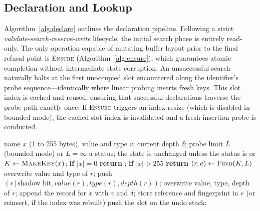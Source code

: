 \subsection{Declaration and Lookup}
Algorithm~\ref{alg:declare} outlines the declaration pipeline. Following a strict \emph{validate-search-reserve-write} lifecycle, the initial search phase is entirely read-only. The only operation capable of mutating buffer layout prior to the final refusal point is \textsc{Ensure} (Algorithm~\ref{alg:ensure}), which guarantees atomic completion without intermediate state corruption. An unsuccessful search naturally halts at the first unoccupied slot encountered along the identifier's probe sequence—identically where linear probing inserts fresh keys. This slot index is cached and reused, ensuring that successful declarations traverse the probe path exactly once. If \textsc{Ensure} triggers an index resize (which is disabled in bounded mode), the cached slot index is invalidated and a fresh insertion probe is conducted.

\begin{algorithm}[t!]
\caption{\textsc{Declare}$(x, v)$}
\label{alg:declare}
\begin{algorithmic}[1]
\REQUIRE name $x$ (1 to 255 bytes), value and type $v$; current depth $\delta$; probe limit $L$ (bounded mode) or $L=\infty$
\ENSURE a status; the state is unchanged unless the status is  or 
 \RETURN {} \ENDIF
\STATE $K \leftarrow \textsc{MakeKey}(x)$; \textbf{if} $|x|=0$ \textbf{return} ; \textbf{if} $|x|>255$ \textbf{return} 
\STATE $(r, e) \leftarrow \textsc{Find}(K, L)$ \hfill{}
  \STATE overwrite value and type of $r$; \RETURN {}
   \RETURN {} \ENDIF
  \STATE push $(r\,|\,\text{shadow bit}, \mathit{value}(r), \mathit{type}(r), \mathit{depth}(r))$; overwrite value, type, depth of $r$; \RETURN {}
\ENDIF
{} \RETURN {} \ENDIF
{} \RETURN {} \ENDIF \hfill{}
 \RETURN {} \ENDIF \hfill{}
\STATE append the record for $x$ with $v$ and $\delta$; store reference and fingerprint in $e$ (or reinsert, if the index was rebuilt)
\STATE push the slot on the undo stack; \RETURN {}
\end{algorithmic}
\end{algorithm}

